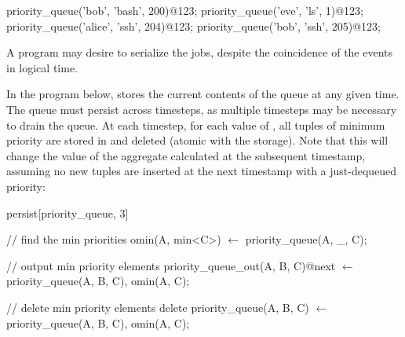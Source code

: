 \begin{Dedalus}
priority\_queue('bob', 'bash', 200)@123;
priority\_queue('eve', 'ls', 1)@123;
priority\_queue('alice', 'ssh', 204)@123;
priority\_queue('bob', 'ssh', 205)@123;
\end{Dedalus}

A program may desire to serialize the jobs, despite the coincidence of the
 events in logical time.



In the program below,  stores the current contents of
the queue at any given time.  The queue must persist across timesteps, as
multiple timesteps may be necessary to drain the queue.  At each timestep, for
each value of , all tuples of minimum priority are stored in
 and deleted (atomic with the storage).  Note
that this will change the value of the aggregate calculated at the subsequent
timestamp, assuming no new tuples are inserted at the next timestamp with a
just-dequeued priority:

\begin{Dedalus}
persist[priority\_queue, 3]

// find the min priorities
omin(A, min<C>) \(\leftarrow\)
  priority\_queue(A, _, C);

// output min priority elements
priority_queue_out(A, B, C)@next \(\leftarrow\)
  priority\_queue(A, B, C), omin(A, C);

// delete min priority elements
delete priority\_queue(A, B, C) \(\leftarrow\)
  priority\_queue(A, B, C), omin(A, C);
\end{Dedalus}


